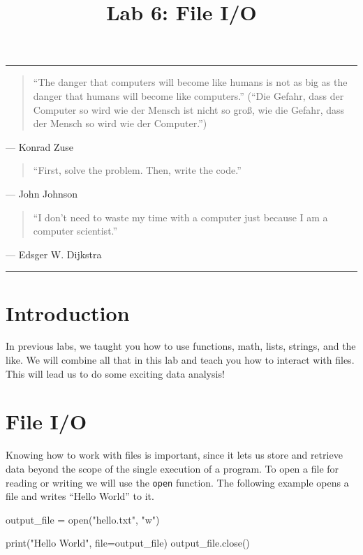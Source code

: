 \documentclass[11pt]{cselabheader}
\title{Lab 6: File I/O}
\begin{document}
\maketitle

\hrule
\begin{quotation}
``The danger that computers will become like humans is not as big as the danger
that humans will become like computers.'' (``Die Gefahr, dass der Computer so
wird wie der Mensch ist nicht so gro\ss, wie die Gefahr, dass der Mensch so wird
wie der Computer.'')
\end{quotation}
\begin{flushright}
--- Konrad Zuse
\end{flushright}

\begin{quotation}
	``First, solve the problem. Then, write the code.''
\end{quotation}
\begin{flushright}
	--- John Johnson
\end{flushright}

\begin{quotation}
``I don’t need to waste my time with a computer just because I am a computer
scientist.''
\end{quotation}
\begin{flushright}
--- Edsger W. Dijkstra
\end{flushright}

\hrule

\section{Introduction}
In previous labs, we taught you how to use functions, math, lists, strings, and
the like. We will combine all that in this lab and teach you how to interact
with files. This will lead us to do some exciting data analysis!

\section{File I/O}
Knowing how to work with files is important, since it lets us store and retrieve
data beyond the scope of the single execution of a program. To open a file for
reading or writing we will use the \lstinline{open} function. The following
example opens a file and writes ``Hello World'' to it.

\begin{python3code}
output_file = open("hello.txt", "w")

print("Hello World", file=output_file)
output_file.close()
\end{python3code}
\end{document}
